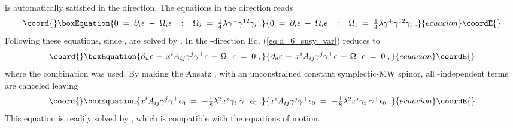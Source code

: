 \documentclass[a4paper,12pt]{article}
\begin{document}
is automatically satisfied in the \coordHE{} direction. The equations in the \coordHE{} direction reads
\begin{equation}\coord{}\boxEquation{
 0\;=\; \partial_{i}\epsilon \;-\; \Omega_{i}\epsilon \hspace{.3cm}:\hspace{.3cm} 
        \Omega_{i} \;=\; \textstyle{\frac{1}{4}}\lambda\gamma^{+}\gamma^{12}\gamma_{i} \; .
}{
 0\;=\; \partial_{i}\epsilon \;-\; \Omega_{i}\epsilon \hspace{.3cm}:\hspace{.3cm} 
        \Omega_{i} \;=\; \textstyle{\frac{1}{4}}\lambda\gamma^{+}\gamma^{12}\gamma_{i} \; .
}{ecuacion}\coordE{}\end{equation}
{}Following \cite{art:blau,art:FP} these equations, since \coordHE{}, are solved by
\coordHE{}.
In the \coordHE{}-direction Eq. (\ref{eq:d=6_susy_var}) reduces to
\begin{equation}\coord{}\boxEquation{
\partial_{u}\epsilon\,-\, x^{i}A_{ij}\gamma^{j}\gamma^{+}\epsilon \,-\, \Omega^{-}\epsilon \;=\; 0 \; , 
}{
\partial_{u}\epsilon\,-\, x^{i}A_{ij}\gamma^{j}\gamma^{+}\epsilon \,-\, \Omega^{-}\epsilon \;=\; 0 \; , 
}{ecuacion}\coordE{}\end{equation}
where the combination \coordHE{} was used.
By making the Ansatz \coordHE{}, with \coordHE{} an unconstrained
constant symplectic-MW spinor, all \coordHE{}-independent terms are canceled leaving
\begin{equation}\coord{}\boxEquation{
  \label{eq:d=6_cond_A}
  x^{i}A_{ij}\gamma^{j}\gamma^{+}\epsilon_{0} \;=\; -\textstyle{\frac{1}{8}}\lambda^{2} x^{i}\gamma_{i}\ \gamma^{+}\epsilon_{0} \; .
}{
  x^{i}A_{ij}\gamma^{j}\gamma^{+}\epsilon_{0} \;=\; -\textstyle{\frac{1}{8}}\lambda^{2} x^{i}\gamma_{i}\ \gamma^{+}\epsilon_{0} \; .
}{ecuacion}\coordE{}\end{equation}
This equation is readily solved by \coordHE{}, which is compatible
with the equations of motion.
%
%
\end{document}
